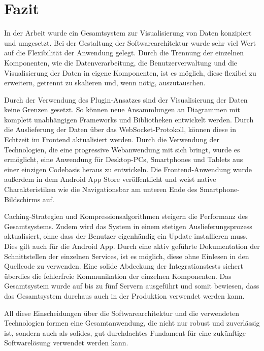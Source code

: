 \chapter{Fazit}
\label{chap:fazit}

In der Arbeit wurde ein Gesamtsystem zur Visualisierung von Daten konzipiert und
umgesetzt. Bei der Gestaltung der Softwarearchitektur wurde sehr viel Wert auf
die Flexibilität der Anwendung gelegt. Durch die Trennung der einzelnen Komponenten,
wie die Datenverarbeitung, die Benutzerverwaltung und die Visualisierung der Daten
in eigene Komponenten, ist es möglich, diese flexibel zu erweitern,
getrennt zu skalieren und, wenn nötig, auszutauschen. 

Durch der Verwendung des Plugin-Ansatzes sind der Visualisierung der Daten keine Grenzen gesetzt.
So können neue Ansammlungen an Diagrammen mit komplett unabhängigen Frameworks und
Bibliotheken entwickelt werden. Durch die Auslieferung der Daten über
das WebSocket-Protokoll, können diese in Echtzeit im Frontend aktualisiert werden.
Durch die Verwendung der Technologien, die eine progressive Webanwendung mit sich bringt,
wurde es ermöglicht, eine Anwendung für Desktop-PCs, Smartphones und Tablets aus einer einzigen
Codebasis heraus zu entwickeln. Die Frontend-Anwendung wurde außerdem in dem Android App Store
veröffentlicht und weist native Charakteristiken wie die Navigationsbar am unteren
Ende des Smartphone-Bildschirms auf. 

Caching-Strategien und Kompressionsalgorithmen steigern die Performanz des Gesamtsystems.
Zudem wird das System in einem stetigen Auslieferungsprozess aktualisiert, ohne dass
der Benutzer eigenhändig ein Update installieren muss. Dies gilt auch für die Android App.
Durch eine aktiv geführte Dokumentation der Schnittstellen der einzelnen Services,
ist es möglich, diese ohne Einlesen in den Quellcode zu verwenden. Eine solide Abdeckung der Integrationstests sichert überdies die
fehlerfreie Kommunikation der einzelnen Komponenten. Das Gesamtsystem wurde auf bis zu
fünf Servern ausgeführt und somit bewiesen, dass das Gesamtsystem durchaus auch in der Produktion
verwendet werden kann.

All diese Einscheidungen über die Softwarearchitektur und die verwendeten Technologien
formen eine Gesamtanwendung, die nicht nur robust und zuverlässig ist, sondern auch
als solides, gut durchdachtes Fundament für eine zukünftige Softwarelösung
verwendet werden kann.
